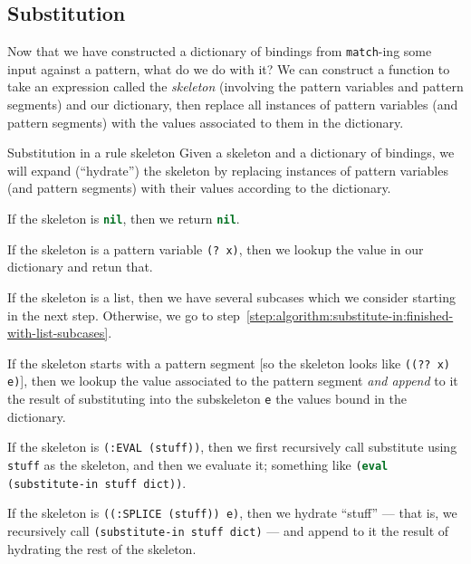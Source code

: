 \subsection{Substitution}

\M
Now that we have constructed a dictionary of bindings from
\lstinline[language=lisp]{match}-ing some input against a
pattern, what do we do with it? We can construct a function to take an
expression called the \emph{skeleton} (involving the pattern variables
and pattern segments) and our dictionary, then replace all instances of
pattern variables (and pattern segments) with the values associated to
them in the dictionary.

\begin{algorithm}{Substitution in a rule skeleton}%
Given a skeleton and a dictionary of bindings, we will expand
(``hydrate'') the skeleton by replacing instances of pattern variables
(and pattern segments) with their values according to the dictionary.\setcounter{algorithmstep}{-1}

 If the skeleton is \lstinline[language=lisp]{nil},
then we return \lstinline[language=lisp]{nil}.

 If the skeleton is a pattern variable
\lstinline[language=lisp]{(? x)}, then we lookup the value in our
dictionary and retun that.

If the skeleton is a list, then we have several subcases which we
consider starting in the next step. Otherwise, we go to step~\ref{step:algorithm:substitute-in:finished-with-list-subcases}.

 If the skeleton starts with
a pattern segment [so the skeleton looks like
\lstinline[language=lisp]{((?? x) e)}], then we lookup the value
associated to the pattern segment \emph{and append} to it the result of
substituting into the subskeleton \lstinline[language=lisp]{e} the
values bound in the dictionary.

 If the skeleton is
\lstinline[language=lisp]{(:EVAL (stuff))}, then we first recursively
call substitute using \lstinline[language=lisp]{stuff} as the skeleton,
and then we evaluate it; something like
\lstinline[language=lisp]{(eval (substitute-in stuff dict))}.

 If the skeleton is
\lstinline[language=lisp]{((:SPLICE (stuff)) e)}, then we hydrate
``stuff'' --- that is, we recursively call
\lstinline[language=lisp]{(substitute-in stuff dict)} --- and append to
it the result of hydrating the rest of the skeleton.


\end{algorithm}
